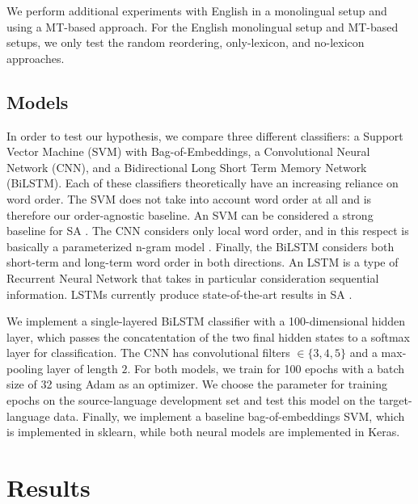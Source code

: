 \documentclass[11pt,a4paper]{article}
\begin{document}
We perform additional experiments with English in a monolingual setup and using a MT-based approach. For the English monolingual setup and MT-based setups, we only test the random reordering, only-lexicon, and no-lexicon approaches.

\subsection{Models}

In order to test our hypothesis, we compare three different classifiers: a Support Vector Machine (SVM) with Bag-of-Embeddings, a Convolutional Neural Network (CNN), and a Bidirectional Long Short Term Memory Network (BiLSTM). Each of these classifiers theoretically have an increasing reliance on word order. The SVM does not take into account word order at all and is therefore our order-agnostic baseline. An SVM can be considered a strong baseline for SA \cite{Kiritchenko2014c}. The CNN considers only local word order, and in this respect is basically a parameterized n-gram model \cite{Santos2014,Severyn2015,Barnes2017}. Finally, the BiLSTM considers both short-term and long-term word order in both directions. An LSTM is a type of Recurrent Neural Network that takes in particular consideration sequential information. LSTMs currently produce state-of-the-art results in SA \cite{Tai2015a,Barnes2017,Howard2018}. 

We implement a single-layered BiLSTM classifier with a 100-dimensional hidden layer, which passes the concatentation of the two final hidden states to a softmax layer for classification. The CNN has convolutional filters $\in \{3,4,5\}$ and a max-pooling layer of length $2$. For both models, we train for 100 epochs with a batch size of 32 using Adam as an optimizer. We choose the parameter for training epochs on the source-language development set and test this model on the target-language data. Finally, we implement a baseline bag-of-embeddings SVM, which is implemented in sklearn, while both neural models are implemented in Keras.

\section{Results}
\end{document}

